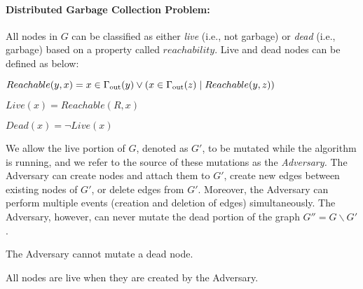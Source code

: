 \paragraph{Distributed Garbage Collection Problem:}
All nodes in $G$ can be classified as either {\em live} (i.e., not garbage) or {\em dead} (i.e., garbage) based on a property called
$reachability$. Live and dead nodes can be defined as below:




$Reachable(y,x) = x \in \Gamma_{\rm out}(y) \lor (x \in \Gamma_{\rm out}(z) \mid Reachable(y,z))$

$Live(x) = Reachable(R,x)$

$Dead(x) = \neg Live(x)$

We allow the live portion
of $G$, denoted as $G'$, to be mutated while the algorithm is running, and we refer
to the source of these mutations as the {\em Adversary.}
The Adversary can create nodes and attach them to $G'$, create new edges between existing nodes of $G'$, or delete edges from $G'$. Moreover, the Adversary can perform multiple events (creation and deletion of edges)
simultaneously. The Adversary, however, can never mutate the dead portion of the graph $G'' = G\backslash G'$.

\begin{axiom}
 The Adversary cannot mutate a dead node.
 \label{ax:immut}
\end{axiom}

\begin{axiom}
 All nodes are live when they are created by the Adversary.
\end{axiom}

